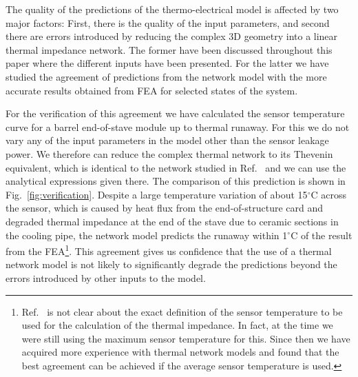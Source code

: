 The quality of the predictions of the thermo-electrical model is affected by two major factors: First, there is the quality of the input parameters, and second there are errors introduced by reducing the complex 3D geometry into a linear thermal impedance network. The former have been discussed throughout this paper where the different inputs have been presented. For the latter we have studied the agreement of predictions from the network model with the more accurate results obtained from FEA for selected states of the system.

For the verification of this agreement we have calculated the sensor temperature curve for a barrel end-of-stave module up to thermal runaway. For this we do not vary any of the input parameters in the model other than the sensor leakage power. We therefore can reduce the complex thermal network to its Thevenin equivalent, which is identical to the network studied in Ref.~\cite{Beck:2010zzd} and we can use the analytical expressions given there. The comparison of this prediction is shown in Fig.~\ref{fig:verification}. Despite a large temperature variation of about 15$^\circ$C across the sensor, which is caused by heat flux from the end-of-structure card and degraded thermal impedance at the end of the stave due to ceramic sections in the cooling pipe, the network model predicts the runaway within 1$^\circ$C of the result from the FEA\footnote{Ref.~\cite{Beck:2010zzd} is not clear about the exact definition of the sensor temperature to be used for the calculation of the thermal impedance. In fact, at the time we were still using the maximum sensor temperature for this. Since then we have acquired more experience with thermal network models and found that the best agreement can be achieved if the average sensor temperature is used.}. This agreement gives us confidence that the use of a thermal network model is not likely to significantly degrade the predictions beyond the errors introduced by other inputs to the model. 

